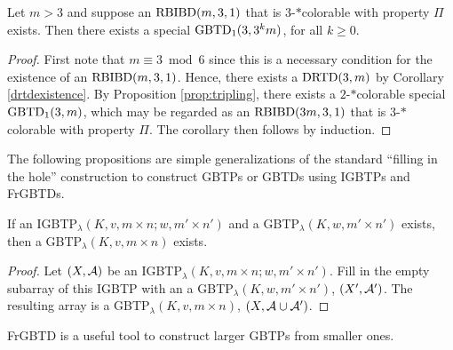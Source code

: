 \documentclass[draft, 11pt]{article}
\begin{document}
\begin{corollary}
\label{cor:3^km}
Let $m>3$ and
suppose  an $\textrm{RBIBD}(m,3,1)$ that is $3$-$*$colorable with property $\Pi$ exists.
Then there exists a special $\textrm{GBTD}_1(3,3^k m)$, for all $k\geq 0$.
\end{corollary}

\begin{proof}
First note that $m\equiv 3\bmod 6$ since this is a necessary condition for the
existence of an $\textrm{RBIBD}(m,3,1)$. Hence, there exists a $\textrm{DRTD}(3,m)$ by
Corollary \ref{drtdexistence}.
By Proposition \ref{prop:tripling}, there exists a $2$-$*$colorable special
$\textrm{GBTD}_1(3,m)$, which may be regarded as an $\textrm{RBIBD}(3m,3,1)$ that is
$3$-$*$colorable with property $\Pi$. The corollary then follows by induction.
\end{proof}

The following propositions are simple generalizations of the standard ``filling in the hole'' construction
to construct GBTPs or GBTDs using IGBTPs and FrGBTDs.

  
 \begin{proposition}
 \label{prop:filling hole for IGBTP} 
 If an IGBTP$_\lambda(K,v,m\times n; w,m'\times n')$ 
 and a GBTP$_\lambda(K,w,m'\times n')$ exists,
 then a GBTP$_\lambda(K,v,m\times n)$ exists.
 \end{proposition}
 
\begin{proof}
Let $(X,\mathcal A)$	be an IGBTP$_\lambda(K,v,m\times n; w,m'\times n')$.	
Fill in the empty subarray of this IGBTP with an
a GBTP$_\lambda(K,w,m'\times n')$, $(X',\mathcal A')$.
The resulting array is a GBTP$_\lambda(K,v,m\times n)$, $(X,\mathcal A\cup\mathcal A')$.
\end{proof}



 FrGBTD is a useful tool to construct larger GBTPs from smaller ones.
  
\end{document}
